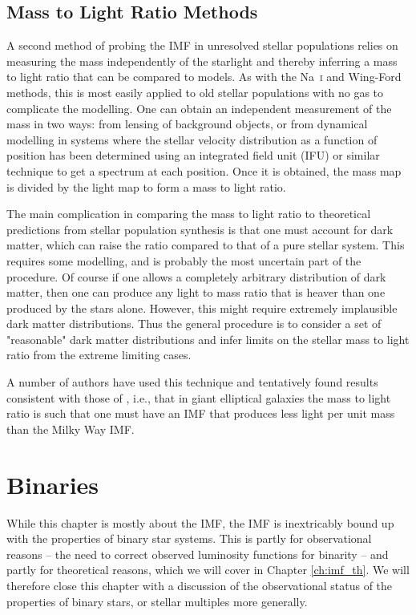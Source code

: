 \subsection{Mass to Light Ratio Methods}

A second method of probing the IMF in unresolved stellar populations relies on measuring the mass independently of the starlight and thereby inferring a mass to light ratio that can be compared to models. As with the Na~\textsc{i} and Wing-Ford methods, this is most easily applied to old stellar populations with no gas to complicate the modelling. One can obtain an independent measurement of the mass in two ways: from lensing of background objects, or from dynamical modelling in systems where the stellar velocity distribution as a function of position has been determined using an integrated field unit (IFU) or similar technique to get a spectrum at each position. Once it is obtained, the mass map is divided by the light map to form a mass to light ratio.

The main complication in comparing the mass to light ratio to theoretical predictions from stellar population synthesis is that one must account for dark matter, which can raise the ratio compared to that of a pure stellar system. This requires some modelling, and is probably the most uncertain part of the procedure. Of course if one allows a completely arbitrary distribution of dark matter, then one can produce any light to mass ratio that is heaver than one produced by the stars alone. However, this might require extremely implausible dark matter distributions. Thus the general procedure is to consider a set of "reasonable" dark matter distributions and infer limits on the stellar mass to light ratio from the extreme limiting cases.

A number of authors have used this technique \citep[e.g.,][]{cappellari12a} and tentatively found results consistent with those of \citet{van-dokkum10a}, i.e., that in giant elliptical galaxies the mass to light ratio is such that one must have an IMF that produces less light per unit mass than the Milky Way IMF.

\section{Binaries}

While this chapter is mostly about the IMF, the IMF is inextricably bound up with the properties of binary star systems. This is partly for observational reasons -- the need to correct observed luminosity functions for binarity -- and partly for theoretical reasons, which we will cover in Chapter \ref{ch:imf_th}. We will therefore close this chapter with a discussion of the observational status of the properties of binary stars, or stellar multiples more generally.

